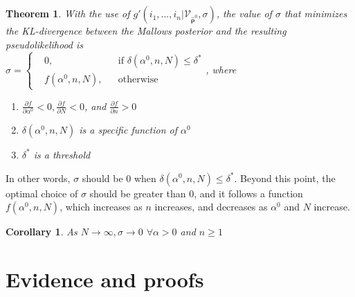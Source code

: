 \documentclass[11pt, oneside]{article}   	%
\newtheorem{theorem}{Theorem}[subsection]
\newtheorem{corollary}{Corollary}[theorem]
\begin{document}
\subsection{ }
\begin{theorem}\label{theorem:sigmafunction}
With the use of  $g'(i_1, ...,i_n|\mathcal{V}_{\hat{\bm{\rho}}^0}, \sigma)$, the value of $\sigma$ that minimizes the KL-divergence between the Mallows posterior and the resulting pseudolikelihood is\\
 $
\sigma = \left \{
\begin{aligned}
&0, && \text{if } \delta(\alpha^0,n,N)\leq \delta ^{*} \\
&f(\alpha^0, n,N), && \text{otherwise}
\end{aligned} \right.
$, where 
\begin{enumerate}
	\item{$\frac{\partial f}{\partial \alpha^0} <0, \frac{\partial f}{\partial N} <0$, and $\frac{\partial f}{\partial n} >0$}
	\item{$\delta(\alpha^0, n,N)$ is a specific function of $\alpha^0$}
	\item{$\delta ^*$ is a threshold}
	
\end{enumerate}
\end{theorem}

In other words, $\sigma$ should be 0 when $\delta(\alpha^0,n,N) \leq \delta^*$. Beyond this point, the optimal choice of $\sigma$ should be greater than 0, and it follows a function $f(\alpha^0,n,N)$, which increases as $n$ increases, and decreases as $\alpha^0$ and $N$ increase.
\begin{corollary}
	As $N \rightarrow \infty,\sigma \rightarrow 0$  $ \forall \alpha >0$ and $n \geq 1$
\end{corollary}

\section{Evidence and proofs}
\end{document}
